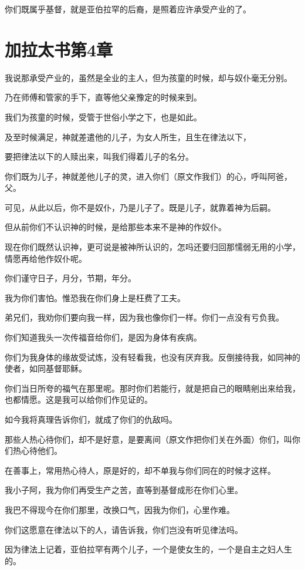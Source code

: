 \documentclass[12pt,oneside]{book}
\begin{document}
你们既属乎基督，就是亚伯拉罕的后裔，是照着应许承受产业的了。

\chapter{加拉太书第4章}
我说那承受产业的，虽然是全业的主人，但为孩童的时候，却与奴仆毫无分别。

乃在师傅和管家的手下，直等他父亲豫定的时候来到。

我们为孩童的时候，受管于世俗小学之下，也是如此。

及至时候满足，神就差遣他的儿子，为女人所生，且生在律法以下，

要把律法以下的人赎出来，叫我们得着儿子的名分。

你们既为儿子，神就差他儿子的灵，进入你们（原文作我们）的心，呼叫阿爸，父。

可见，从此以后，你不是奴仆，乃是儿子了。既是儿子，就靠着神为后嗣。

但从前你们不认识神的时候，是给那些本来不是神的作奴仆。

现在你们既然认识神，更可说是被神所认识的，怎吗还要归回那懦弱无用的小学，情愿再给他作奴仆呢。

你们谨守日子，月分，节期，年分。

我为你们害怕。惟恐我在你们身上是枉费了工夫。

弟兄们，我劝你们要向我一样，因为我也像你们一样。你们一点没有亏负我。

你们知道我头一次传福音给你们，是因为身体有疾病。

你们为我身体的缘故受试炼，没有轻看我，也没有厌弃我。反倒接待我，如同神的使者，如同基督耶稣。

你们当日所夸的福气在那里呢。那时你们若能行，就是把自己的眼睛剜出来给我，也都情愿。这是我可以给你们作见证的。

如今我将真理告诉你们，就成了你们的仇敌吗。

那些人热心待你们，却不是好意，是要离间（原文作把你们关在外面）你们，叫你们热心待他们。

在善事上，常用热心待人，原是好的，却不单我与你们同在的时候才这样。

我小子阿，我为你们再受生产之苦，直等到基督成形在你们心里。

我巴不得现今在你们那里，改换口气，因我为你们，心里作难。

你们这愿意在律法以下的人，请告诉我，你们岂没有听见律法吗。

因为律法上记着，亚伯拉罕有两个儿子，一个是使女生的，一个是自主之妇人生的。
\end{document}
